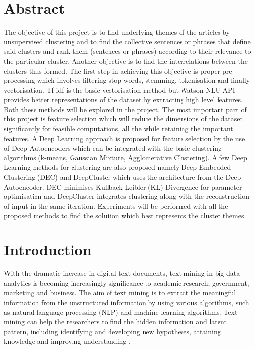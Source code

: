 \documentclass[12pt]{article}
\begin{document}
\section*{Abstract}
The objective of this project is to find underlying themes of the articles by unsupervised clustering and to find the collective sentences or phrases that define said clusters and rank them (sentences or phrases) according to their relevance to the particular cluster. Another objective is to find the interrelations between the clusters thus formed. The first step in achieving this objective is proper pre-processing which involves filtering stop words, stemming, tokenisation and finally vectorisation. Tf-idf is the basic vectorisation method but Watson NLU API provides better representations of the dataset by extracting high level features. Both these methods will be explored in the project. The most important part of this project is feature selection which will reduce the dimensions of the dataset significantly for feasible computations, all the while retaining the important features. A Deep Learning approach is proposed for feature selection by the use of Deep Autoencoders which can be integrated with the basic clustering algorithms (k-means, Gaussian Mixture, Agglomerative Clustering). A few Deep Learning methods for clustering are also proposed namely Deep Embedded Clustering (DEC) and DeepCluster which uses the architecture from the Deep Autoencoder. DEC minimises Kullback-Leibler (KL) Divergence for parameter optimisation and DeepCluster integrates clustering along with the reconstruction of input in the same iteration. Experiments will be performed with all the proposed methods to find the solution which best represents the cluster themes. 



\cleardoublepage


\tableofcontents
\thispagestyle{empty}
\cleardoublepage



\setcounter{page}{1}
\section{Introduction}\label{sec:intro}
With the dramatic increase in digital text documents, text mining in big data analytics is becoming increasingly significance to academic research, government, marketing and business\cite{cogburn2017introduction}. The aim of text mining is to extract the meaningful information from the unstructured information by using various algorithms, such as natural language processing (NLP) and machine learning algorithms. Text mining can help the researchers to find the hidden information and latent pattern, including identifying and developing new hypotheses, attaining knowledge and improving understanding \cite{3benefit}. \\
\end{document}
